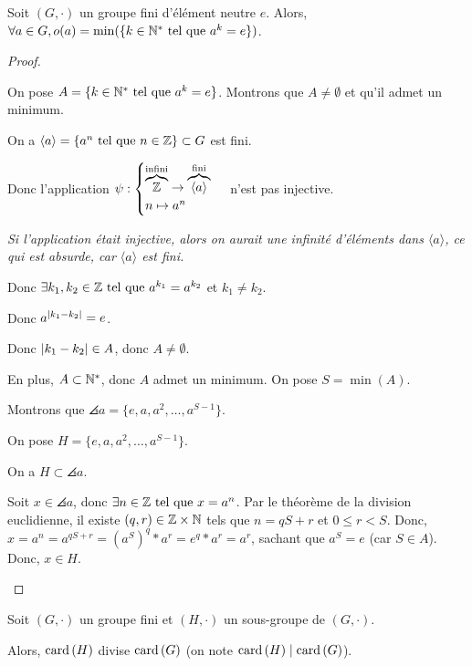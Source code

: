 \documentclass[12pt,a4paper]{report}
\begin{document}
\begin{property}
    Soit $(G,\cdot)$ un groupe fini d'élément neutre $e$. Alors, $\forall a \in G, o(a) = \min(\{k\in\mathbb{N}^* \text{ tel que } a^k = e\})$.
\end{property}

\begin{proof}
    \begin{outline}
        \1 On pose $A=\{k\in\mathbb{N}^* \text{ tel que } a^k = e\}$. Montrons que $A\ne\emptyset$ et qu'il admet un minimum.

        \2 On a $\left\langle a\right\rangle = \{a^n \text{ tel que } n \in \mathbb{Z}\} \subset G$ est fini.

        \2 Donc l'application $\psi : \begin{cases}\overbrace{\mathbb{Z}}^{\text{infini}} \to \overbrace{\left\langle a\right\rangle}^{\text{fini}}\\ n \mapsto a^n\end{cases}$ n'est pas injective.

        \3 \textit{Si l'application était injective, alors on aurait une infinité d'éléments dans $\langle a \rangle$, ce qui est absurde, car $\langle a \rangle$ est fini.}

        \2 Donc $\exists k_1,k_2 \in \mathbb{Z} \text{ tel que } a^{k_1} = a^{k_2}$ et $k_1 \ne k_2$.

        \2 Donc $a^{\left|k_1 - k_2\right|} = e$.

        \2 Donc $\left|k_1 - k_2\right| \in A$, donc $A \ne \emptyset$.

        \2 En plus, $A \subset \mathbb{N}^*$, donc $A$ admet un minimum. On pose $S=\min(A)$.

        \1 Montrons que $\angles{a} = \{e, a, a^2, \ldots, a^{S-1}\}$.

        \2 On pose $H = \{e, a, a^2, \ldots, a^{S-1}\}$.

        \2 On a $H \subset \angles{a}$.

        \2 Soit $x\in\angles{a}$, donc $\exists n \in \mathbb{Z} \text{ tel que } x = a ^n$.
        \2 Par le théorème de la division euclidienne, il existe $(q,r) \in \mathbb{Z} \times \mathbb{N}$ tels que $n = qS + r$ et $0 \le r < S$.
        \2 Donc, $x = a^n = a^{qS + r} = (a^S)^q * a^r = e^q * a^r = a^r$, sachant que $a^S = e$ (car $S \in A$).
        \2 Donc, $x \in H$.
    \end{outline}
\end{proof}

\begin{theorem}
    Soit $(G,\cdot)$ un groupe fini et $(H,\cdot)$ un sous-groupe de $(G,\cdot)$.

    Alors, $\mathrm{card}\left(H\right)$ divise $\mathrm{card}\left(G\right)$ (on note $\mathrm{card}\left(H\right) \mid \mathrm{card}\left(G\right)$).
\end{theorem}
\end{document}
